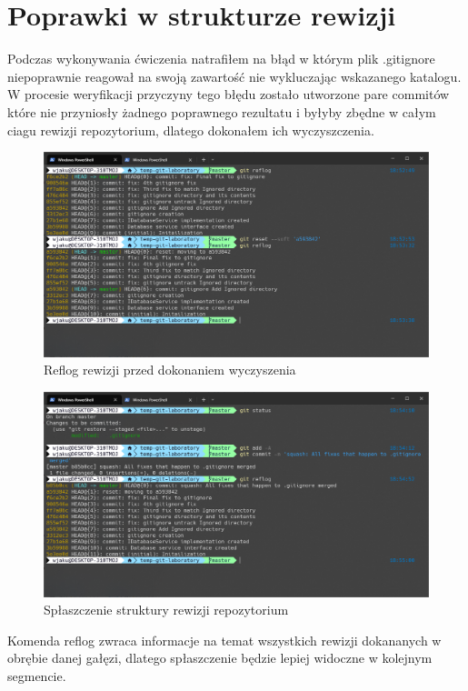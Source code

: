 \documentclass{article}
\begin{document}
\section{Poprawki w strukturze rewizji}

Podczas wykonywania ćwiczenia natrafiłem na błąd w którym plik .gitignore niepoprawnie reagował na swoją zawartość nie wykluczając wskazanego katalogu. W procesie weryfikacji przyczyny tego błędu zostało utworzone pare commitów które nie przyniosły żadnego poprawnego rezultatu i byłyby zbędne w całym ciagu rewizji repozytorium, dlatego dokonałem ich wyczyszczenia. 

\vspace*{\fill}
\begin{figure}[!h]
    \caption{Reflog rewizji przed dokonaniem wyczyszenia}
    \centerline{\includegraphics [scale=0.5]{before-squash.PNG}}
    \label{fig:label}
\end{figure}
\vspace*{\fill}
\newpage

\vspace*{\fill}
\begin{figure}[!h]
    \caption{Spłaszczenie struktury rewizji repozytorium}
    \centerline{\includegraphics [scale=0.5]{squash.PNG}}
    \label{fig:label}
\end{figure}
Komenda reflog zwraca informacje na temat wszystkich rewizji dokananych w obrębie danej gałęzi, dlatego spłaszczenie będzie lepiej widoczne w kolejnym segmencie.
\vspace*{\fill}
\newpage
\end{document}
